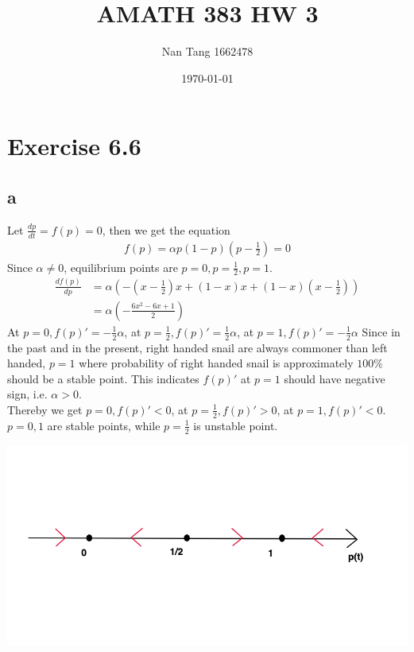 \documentclass[11pt,letterpaper]{article}
\title{AMATH 383 HW 3}
\author{Nan Tang 1662478}
\date{\today}
\begin{document}
\maketitle

\section*{Exercise 6.6}
\subsection*{a}
\noindent Let $\frac{dp}{dt} = f(p) = 0$, then we get the equation
\begin{align*}
f(p) = \alpha p(1 - p) (p - \frac{1}{2}) = 0
\end{align*}
\noindent Since $\alpha \neq 0$, equilibrium points are $p = 0, p =\frac{1}{2}, p = 1$.
\begin{align*}
\frac{d f(p)}{dp} &= \alpha (- (x - \frac{1}{2}) x + (1 - x)x + (1 - x)(x - \frac{1}{2})) \\
&= \alpha (- \frac{6x^2 - 6x + 1}{2})
\end{align*}
\noindent At $p = 0, f(p)' = - \frac{1}{2} \alpha$, at $p = \frac{1}{2}, f(p)' = \frac{1}{2} \alpha$, at $p = 1, f(p)' = - \frac{1}{2} \alpha$
\noindent Since in the past and in the present, right handed snail are always commoner than left handed, $p = 1$ where probability of right handed snail is approximately $100 \%$ should be a stable point. This indicates $f(p)'$ at $p = 1$ should have negative sign, i.e. $\alpha > 0$. \\

\noindent Thereby we get $p = 0, f(p)' < 0$, at $p = \frac{1}{2}, f(p)' > 0$, at $p = 1, f(p)' < 0$. $p = 0, 1$ are stable points, while $p= \frac{1}{2}$ is unstable point. 


\includegraphics[scale=0.3]{hw3-1.png}
\end{document}
